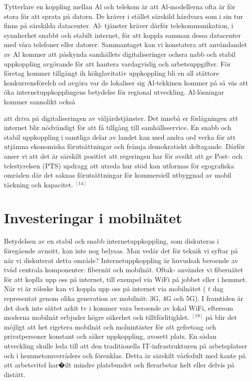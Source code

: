 {{Tytterlare en koppling mellan Al och telekom är att Al-modellerna ofta är för stora för att sprata på datorn. De kräver i stället särskild hårdvara som i sin tur finns på särskilda datacenter. Al- tjänster kräver därför telekommunikation, i synnherhet snabbt och stabilt internet, för att koppla samman dessa datacenter med våra telefoner eller datorer.
Sammantaget kan vi konstatera att användandet av Al kommer att påskynda samhällets digitaliseringer ochsra nabb och stabil uppkoppling avgörande för att hantera vardagvislig och arbetsuppgifter. För företag kommer tillgängt ih hökglavitativ uppkoppling bli en all stättore konkurrensförelch od avgöra var de lokaliser sig Al-tekkinen kommer på så väs att öka internetuppkopplingens betydelse för regional utveckling. Al-lösningar kommer sannolikt också

att driva på digitaliseringen av väljårdstjänster. Det innebå er förlågningen att internet blir nödvändigt för att få tillgång till samhällsservice.
En snabb och stabil uppkoppling i samtliga delar av landet kan med andra ord verka för att utjämna ekonomiska förutsättningar och främja demokratiskt deltagande. Dårför anser vi att det är särskilt positivt att regeringen har för avsikt att ge Post- och telestyrelsen (PTS) updragg att utreda hur stöd kan utformas för egografiska områden där det saknas förutsättningar för kommersiell utbyggnad av mobil täckning och kapacitet. \({ }^{[14]}\)
\section*{Investeringar i mobilnätet}
Betydelsen av en stabil och snabb internetuppkoppling, som diskuteras i föregående avnsitt, kan inte nog belysas. Man vedår det för teknik vi syftar på när vi diskuterat detta område?
Internetuppkoppling är huvudsak beroende av tvåd centrala komponenter: fibernät och mobilnät. Oftak- använder vi fibernätet för att koplla upp oss på internet, till exempel via WiFi på jobbet eller i hemmet. När vi är röleske kan vi koppla upp oss på internet via mobilnätet ( \(t\) dag representat genom olika generation av mobilnät: 3G, 4G och 5G). I framtiden är det dock inte sättet arkit tv i kommer vara beroende av lokal WiFi, eftersom moderna mobilnät erbjuder högre säkerhet och tilltförlitighlet. \({ }^{[19]}\) på blir det möjligt att het rigetera mobilnät och molnintäster för att gefretoag och privatpersoner konstant och säker uppkoppling, avosett plats. En sådan utveckling skulle leda till att den traditionella IT-infrastrukturen på arbetsplatser och i hemmetomverråders och förenklas. Detta är särskilt vårfedult med kante på att arbetsvitel har�ilt mindre platsbundet och flerarbetar helt eller delvis på distätt.
}}
